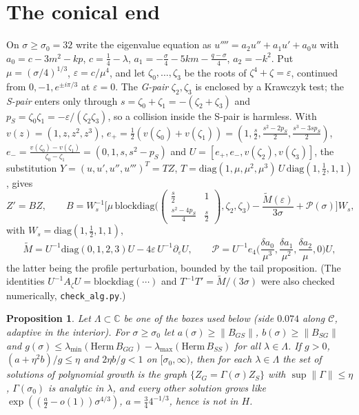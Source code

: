 \documentclass[11pt]{amsart}
\newtheorem{proposition}[theorem]{Proposition}
\theoremstyle{remark}
\newcommand{\C}{\mathbb{C}}
\newcommand{\eps}{\varepsilon}
\begin{document}
\section{The conical end}\label{sec:tail}
On $\sigma\ge\sigma_0=32$ write the eigenvalue equation as $u''''=a_2u''+a_1u'+a_0u$ with $a_0=c-3m^2-kp$, $c=\frac14-\lambda$, $a_1=-\frac\sigma4-5km-\frac{q-\sigma}4$, $a_2=-k^2$. Put $\mu=(\sigma/4)^{1/3}$, $\eps=c/\mu^4$, and let $\zeta_0,\dots,\zeta_3$ be the roots of $\zeta^4+\zeta=\eps$, continued from $0,-1,e^{\pm i\pi/3}$ at $\eps=0$. The \emph{G-pair} $\zeta_2,\zeta_3$ is enclosed by a Krawczyk test; the \emph{S-pair} enters only through $s=\zeta_0+\zeta_1=-(\zeta_2+\zeta_3)$ and $p_S=\zeta_0\zeta_1=-\eps/(\zeta_2\zeta_3)$, so a collision inside the S-pair is harmless. With $v(z)=(1,z,z^2,z^3)$, $e_+=\frac12(v(\zeta_0)+v(\zeta_1))=(1,\frac s2,\frac{s^2-2p_S}2,\frac{s^3-3sp_S}2)$, $e_-=\frac{v(\zeta_0)-v(\zeta_1)}{\zeta_0-\zeta_1}=(0,1,s,s^2-p_S)$ and $U=[e_+,e_-,v(\zeta_2),v(\zeta_3)]$, the substitution $Y=(u,u',u'',u''')^T=TZ$, $T=\mathrm{diag}(1,\mu,\mu^2,\mu^3)\,U\,\mathrm{diag}(1,\frac12,1,1)$, gives
\[
Z'=BZ,\qquad B=W_s^{-1}\Big[\mu\,\mathrm{blockdiag}\Big(\begin{pmatrix}\frac s2&1\\ \frac{s^2-4p_S}4&\frac s2\end{pmatrix},\zeta_2,\zeta_3\Big)-\frac{\widetilde M(\eps)}{3\sigma}+\mathcal P(\sigma)\Big]W_s,
\]
with $W_s=\mathrm{diag}(1,\frac12,1,1)$,
\[
\widetilde M=U^{-1}\mathrm{diag}(0,1,2,3)U-4\eps\,U^{-1}\partial_\eps U,\qquad
\mathcal P=U^{-1}e_4\Big(\frac{\delta a_0}{\mu^3},\frac{\delta a_1}{\mu^2},\frac{\delta a_2}{\mu},0\Big)U,
\]
the latter being the profile perturbation, bounded by the tail proposition. (The identities $U^{-1}A_\zeta U=\mathrm{blockdiag}(\cdots)$ and $T^{-1}T'=\widetilde M/(3\sigma)$ were also checked numerically, \texttt{check\_alg.py}.)

\begin{proposition}\label{prop:lp}
Let $\Lambda\subset\C$ be one of the boxes used below (side $0.074$ along $\mathcal C$, adaptive in the interior). For $\sigma\ge\sigma_0$ let $a(\sigma)\ge\|B_{GS}\|$, $b(\sigma)\ge\|B_{SG}\|$ and $g(\sigma)\le\lambda_{\min}(\mathrm{Herm}\,B_{GG})-\lambda_{\max}(\mathrm{Herm}\,B_{SS})$ for all $\lambda\in\Lambda$. If $g>0$, $(a+\eta^2b)/g\le\eta$ and $2\eta b/g<1$ on $[\sigma_0,\infty)$, then for each $\lambda\in\Lambda$ the set of solutions of polynomial growth is the graph $\{Z_G=\Gamma(\sigma)Z_S\}$ with $\sup\|\Gamma\|\le\eta$, $\Gamma(\sigma_0)$ is analytic in $\lambda$, and every other solution grows like $\exp((\frac a2-o(1))\sigma^{4/3})$, $a=\frac34 4^{-1/3}$, hence is not in $H$.
\end{proposition}
\end{document}
